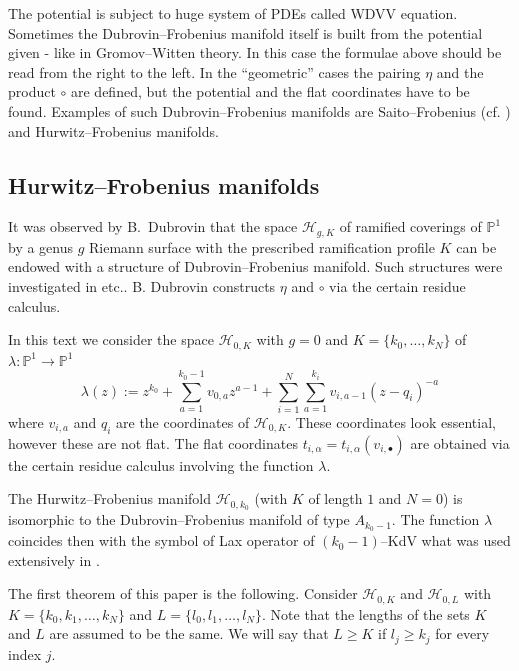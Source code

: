 \documentclass[12pt,a4paper]{amsart}
\newcommand{\PP}{{\mathbb{P}}}
\def\H{{\mathcal H}}
\newcommand{\<}{\left<}
\renewcommand{\>}{\right>}
\numberwithin{equation}{section}
\begin{document}
The potential is subject to huge system of PDEs called WDVV equation. Sometimes the Dubrovin--Frobenius manifold itself is built from the potential given - like in Gromov--Witten theory. In this case the formulae above should be read from the right to the left.
In the ``geometric'' cases the pairing $\eta$ and the product $\circ$ are defined, but the potential and the flat coordinates have to be found.
Examples of such Dubrovin--Frobenius manifolds are Saito--Frobenius (cf. \cite{ST}) and Hurwitz--Frobenius manifolds.

\subsection*{Hurwitz--Frobenius manifolds} It was observed by B.~Dubrovin \cite[Lecture 5]{D2} that the space $\H_{g,K}$ of ramified coverings of $\PP^1$ by a genus $g$ Riemann surface with the prescribed ramification profile $K$ can be endowed with a structure of Dubrovin--Frobenius manifold. Such structures were investigated in \cite{S,M17,B14,PS} etc..
B. Dubrovin constructs $\eta$ and $\circ$ via the certain residue calculus.

In this text we consider the space $\H_{0,K}$ with $g=0$ and $K = \lbrace k_0,\dots,k_N \rbrace$ of $\lambda: \PP^1 \to \PP^1$
\[
 \lambda(z) := z^{k_0} + \sum _{a=1}^{k_0-1} v_{0,a} z^{a-1} + \sum _{i=1}^N \sum _{a=1}^{k_i} v_{i,a-1} \left(z-q_i\right)^{-a}
\]
where $v_{i,a}$ and $q_i$ are the coordinates of $\H_{0,K}$. These coordinates look essential, however these are not flat. The flat coordinates $t_{i,\alpha} = t_{i,\alpha}(v_{i,\bullet})$ are obtained via the certain residue calculus involving the function $\lambda$.

The Hurwitz--Frobenius manifold $\H_{0,k_0}$ (with $K$ of length $1$ and $N = 0$) is isomorphic to the Dubrovin--Frobenius manifold of type $A_{k_0-1}$. The function $\lambda$ coincides then with the symbol of Lax operator of $(k_0-1)$--KdV what was used extensively in \cite{DVV}.

The first theorem of this paper is the following.
Consider $\H_{0,K}$ and $\H_{0,L}$ with $K = \lbrace k_0,k_1,\dots,k_N \rbrace$ and $L = \lbrace l_0,l_1,\dots,l_N \rbrace$. Note that the lengths of the sets $K$ and $L$ are assumed to be the same. We will say that $L \ge K$ if $l_j \ge k_j$ for every index $j$.
\end{document}
